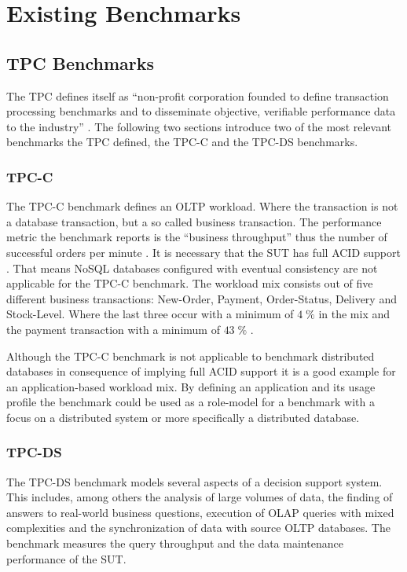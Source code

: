 
\chapter{Existing Benchmarks}
\label{cha:analysis}

\section{TPC Benchmarks}
\label{sec:tpc}
The \acf{TPC} defines itself as \enquote{non-profit corporation founded to define transaction processing benchmarks and to disseminate objective, verifiable performance data to the industry} \cite[10]{tpc.2013}. The following two sections introduce two of the most relevant benchmarks the \ac{TPC} defined, the \ac{TPC}-C and the \ac{TPC}-DS benchmarks. 

\subsection{TPC-C}
\label{subsec:tpc-c}
The \ac{TPC}-C benchmark defines an \acf{OLTP} workload. Where the transaction is not a database transaction, but a so called business transaction. The performance metric the benchmark reports is the \enquote{business throughput} thus the number of successful orders per minute \cite[7]{tpcc.2010}. It is necessary that the \ac{SUT} has full ACID support \cite[47]{tpcc.2010}. That means NoSQL databases configured with eventual consistency are not applicable for the \ac{TPC}-C benchmark. The workload mix consists out of five different business transactions: New-Order, Payment, Order-Status, Delivery and Stock-Level. Where the last three occur with a minimum of $4\;\%$ in the mix and the payment transaction with a minimum of $43\;\%$ \cite[70]{tpcc.2010}.

Although the \ac{TPC}-C benchmark is not applicable to benchmark distributed databases in consequence of implying full ACID support it is a good example for an application-based workload mix. By defining an application and its usage profile the benchmark could be used as a role-model for a benchmark with a focus on a distributed system or more specifically a distributed database.

\subsection{TPC-DS}
\label{subsec:tpc-ds}
The \ac{TPC}-DS benchmark models several aspects of a decision support system. This includes, among others the analysis of large volumes of data, the finding of answers to real-world business questions, execution of \acf{OLAP} queries with mixed complexities and the synchronization of data with source \ac{OLTP} databases. The benchmark measures the query throughput and the data maintenance performance of the \ac{SUT}. \cite[7]{tpcds.2012}

